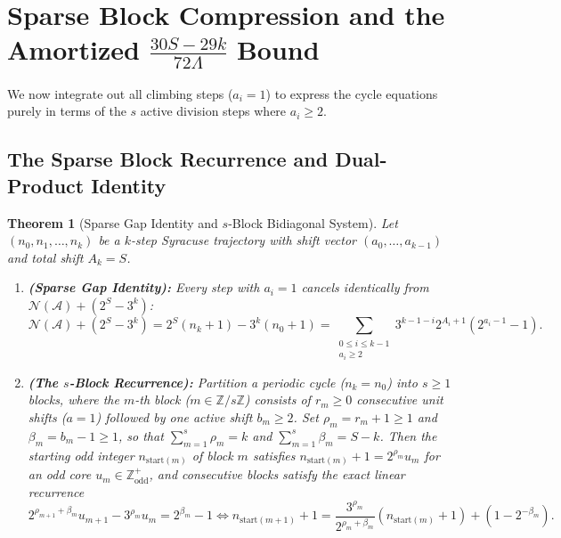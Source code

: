 \documentclass[11pt, a4paper]{amsart}
\newtheorem{theorem}{Theorem}[section]
\theoremstyle{definition}
\newcommand{\Z}{\mathbb{Z}}
\newcommand{\N}{\mathcal{N}}
\newcommand{\A}{\mathcal{A}}
\begin{document}
\section{Sparse Block Compression and the Amortized $\frac{30S - 29k}{72\Lambda}$ Bound}

We now integrate out all climbing steps ($a_i = 1$) to express the cycle equations purely in terms of the $s$ active division steps where $a_i \ge 2$.

\subsection{The Sparse Block Recurrence and Dual-Product Identity}

\begin{theorem}[Sparse Gap Identity and $s$-Block Bidiagonal System]\label{thm:sparse_block}
Let $(n_0, n_1, \dots, n_k)$ be a $k$-step Syracuse trajectory with shift vector $(a_0, \dots, a_{k-1})$ and total shift $A_k = S$.
\begin{enumerate}
    \item \textbf{(Sparse Gap Identity):} Every step with $a_i = 1$ cancels identically from $\N(\A) + (2^S - 3^k)$:
    \begin{equation}\label{eq:sparse_gap}
    \N(\A) + (2^S - 3^k) = 2^S(n_k + 1) - 3^k(n_0 + 1) = \sum_{\substack{0 \le i \le k-1 \\ a_i \ge 2}} 3^{k-1-i} 2^{A_i + 1} \left(2^{a_i - 1} - 1\right).
    \end{equation}
    \item \textbf{(The $s$-Block Recurrence):} Partition a periodic cycle ($n_k = n_0$) into $s \ge 1$ blocks, where the $m$-th block ($m \in \Z/s\Z$) consists of $r_m \ge 0$ consecutive unit shifts ($a = 1$) followed by one active shift $b_m \ge 2$. Set $\rho_m = r_m + 1 \ge 1$ and $\beta_m = b_m - 1 \ge 1$, so that $\sum_{m=1}^s \rho_m = k$ and $\sum_{m=1}^s \beta_m = S - k$. Then the starting odd integer $n_{\text{start}(m)}$ of block $m$ satisfies $n_{\text{start}(m)} + 1 = 2^{\rho_m} u_m$ for an odd core $u_m \in \Z_{\text{odd}}^+$, and consecutive blocks satisfy the exact linear recurrence
    \begin{equation}\label{eq:block_recurrence}
    2^{\rho_{m+1} + \beta_m} u_{m+1} - 3^{\rho_m} u_m = 2^{\beta_m} - 1 \iff n_{\text{start}(m+1)} + 1 = \frac{3^{\rho_m}}{2^{\rho_m + \beta_m}}\left(n_{\text{start}(m)} + 1\right) + \left(1 - 2^{-\beta_m}\right).
    \end{equation}
\end{enumerate}
\end{theorem}
\end{document}
